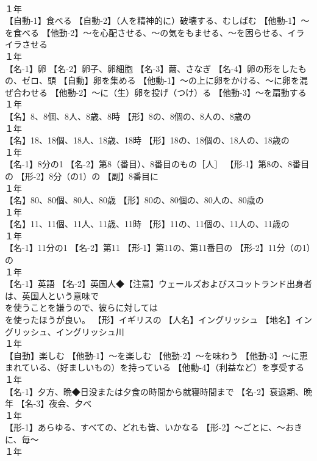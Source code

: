 \documentclass[8pt]{extreport}
\begin{document}
\begin{CJK}{UTF8}{min}
\\	１年	
\\	【自動-1】食べる 【自動-2】（人を精神的に）破壊する、むしばむ 【他動-1】～を食べる 【他動-2】～を心配させる、～の気をもませる、～を困らせる、イライラさせる
\\	１年	
\\	【名-1】卵 【名-2】卵子、卵細胞 【名-3】繭、さなぎ 【名-4】卵の形をしたもの、ゼロ、頭 【自動】卵を集める 【他動-1】～の上に卵をかける、～に卵を混ぜ合わせる 【他動-2】～に（生）卵を投げ（つけ）る 【他動-3】～を扇動する
\\	１年	
\\	【名】8、8個、8人、8歳、8時 【形】8の、8個の、8人の、8歳の
\\	１年	
\\	【名】18、18個、18人、18歳、18時 【形】18の、18個の、18人の、18歳の
\\	１年	
\\	【名-1】8分の1 【名-2】第8（番目）、8番目のもの［人］ 【形-1】第8の、8番目の 【形-2】8分（の1）の 【副】8番目に
\\	１年	
\\	【名】80、80個、80人、80歳 【形】80の、80個の、80人の、80歳の
\\	１年	
\\	【名】11、11個、11人、11歳、11時 【形】11の、11個の、11人の、11歳の
\\	１年	
\\	【名-1】11分の1 【名-2】第11 【形-1】第11の、第11番目の 【形-2】11分（の1）の
\\	１年	
\\	【名-1】英語 【名-2】英国人◆【注意】ウェールズおよびスコットランド出身者は、英国人という意味で 
\\	を使うことを嫌うので、彼らに対しては 
\\	を使ったほうが良い。 【形】イギリスの 【人名】イングリッシュ 【地名】イングリッシュ、イングリッシュ川
\\	１年	
\\	【自動】楽しむ 【他動-1】～を楽しむ 【他動-2】～を味わう 【他動-3】～に恵まれている、（好ましいもの）を持っている 【他動-4】（利益など）を享受する
\\	１年	
\\	【名-1】夕方、晩◆日没または夕食の時間から就寝時間まで 【名-2】衰退期、晩年 【名-3】夜会、夕べ
\\	１年	
\\	【形-1】あらゆる、すべての、どれも皆、いかなる 【形-2】～ごとに、～おきに、毎～
\\	１年	

\end{CJK}
\end{document}
